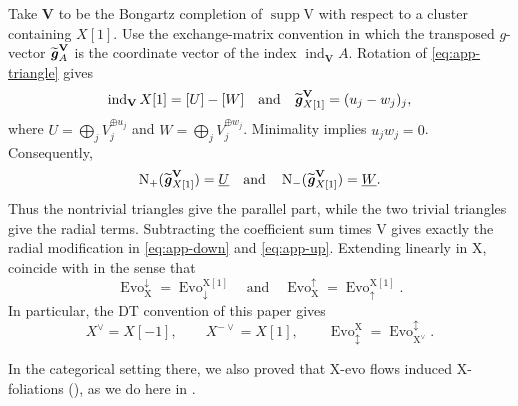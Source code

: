 \documentclass[11pt,reqno]{amsart}
\theoremstyle{plain}
\newtheorem{theorem}{Theorem}[section]
\theoremstyle{definition}
\numberwithin{equation}{section}
\newcommand\hua{\mathcal}
\newcommand\<{\langle}
\renewcommand\>{\rangle}
\renewcommand{\setminus}{\smallsetminus}
\newcommand\Add{\operatorname{add}}
\newcommand\Grot{\operatorname{K}} %
\newcommand{\C}{\operatorname{\hua{C}}} %
\newcommand{\on}[1]{\operatorname{#1}}
\def\CCx{\on{Cpx}}   %
\def\source{X[1]}
\def\sink{X}
\newcommand{\Dflow}[1]{\on{Evo}^{\downarrow}_{#1}}
\newcommand{\Uflow}[1]{\on{Evo}^{\uparrow}_{#1}}
\newcommand{\DUflow}[1]{\on{Evo}^{\updownarrow}_{#1}}
\newcommand{\flowD}[1]{\on{Evo}_{\downarrow}^{#1}}
\newcommand{\flowU}[1]{\on{Evo}_{\uparrow}^{#1}}
\newcommand{\flowDU}[1]{\on{Evo}_{\updownarrow}^{#1}}
\newcommand{\pcts}[1]{\mathbf{#1}}%
\newcommand{\pcto}[1]{\mathbf{#1}_\oplus} %
\newcommand{\ccpt}[1]{\mathrm{#1}}%
\newcommand{\real}[1]{\underline{#1}}%
\def\xevo{\ccpt{X}}%
\newcommand{\bfit}[1]{\textbf{\textit{#1}}}
\def\gvec{\bfit{g}}
\def\supp{\on{supp}}
\newcommand{\DT}[1]{#1^{\vee}}
\newcommand{\iDT}[1]{#1^{-\vee}}
\def\Xevo{\DT{\ccpt{X}}}
\def\normal{\on{N}}
\def\tgvec{\widetilde{\gvec}}
\begin{document}
Take $\pcts{V}$ to be the Bongartz completion of $\supp\ccpt{V}$ with respect to a cluster containing $X[1]$.
Use the exchange-matrix convention in which the transposed $g$-vector
$\tgvec_A^{\pcts{V}}$ is the coordinate vector of the index $\on{ind}_{\pcts{V}}A$.
Rotation of \eqref{eq:app-triangle} gives
\begin{equation}\label{eq:app-index}
    \on{ind}_{\pcts{V}}X[1]=[U]-[W]
    \quad\text{and}\quad
    \tgvec_{X[1]}^{\pcts{V}}=(u_j-w_j)_j,
\end{equation}
where $U=\bigoplus_jV_j^{\oplus u_j}$ and
$W=\bigoplus_jV_j^{\oplus w_j}$. 
Minimality implies $u_jw_j=0$.
Consequently, 
\begin{gather}
    \normal_+(\tgvec^\pcts{V}_{\source})=\real{U}
    \quad\text{and}\quad
    \normal_-(\tgvec^\pcts{V}_{\source})=\real{W}.
\end{gather}
Thus the nontrivial triangles give the parallel part, while the two trivial triangles give the radial terms. 
Subtracting the coefficient sum times $\ccpt{V}$ gives exactly the radial modification in \eqref{eq:app-down} and \eqref{eq:app-up}.
Extending linearly in $\xevo$,
 coincide with  in the sense that
\begin{equation}\label{eq:app-fields}
    \Dflow{\xevo}=\flowD{\xevo[1]}
    \quad\text{and}\quad
    \Uflow{\xevo}=\flowU{\xevo[1]}.
\end{equation}
In particular, the DT convention of this paper gives
\begin{equation}\label{eq:app-shift}
    \DT{X}=X[-1],\qquad \iDT{X}=X[1],
    \qquad
    \flowDU{\xevo}=\DUflow{\Xevo}.
\end{equation}


In the categorical setting there, we also proved that $\xevo$-evo flows induced $\xevo$-foliations (\cite[Thm.~5.10]{QT}), 
as we do here in . 

\end{document}
